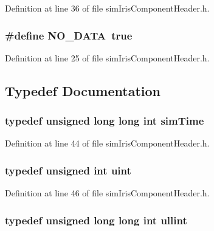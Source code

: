 Definition at line 36 of file simIrisComponentHeader.h.
\subsubsection[{NO\_\-DATA}]{\setlength{\rightskip}{0pt plus 5cm}\#define NO\_\-DATA~true}\label{simIrisComponentHeader_8h_68de9030c39965958f08402f7d452ad9}




Definition at line 25 of file simIrisComponentHeader.h.

\subsection{Typedef Documentation}
\subsubsection[{simTime}]{\setlength{\rightskip}{0pt plus 5cm}typedef unsigned long long int {\bf simTime}}\label{simIrisComponentHeader_8h_d88faca783e7aa496cda721d9029a2e3}




Definition at line 44 of file simIrisComponentHeader.h.
\subsubsection[{uint}]{\setlength{\rightskip}{0pt plus 5cm}typedef unsigned int {\bf uint}}\label{simIrisComponentHeader_8h_91ad9478d81a7aaf2593e8d9c3d06a14}




Definition at line 46 of file simIrisComponentHeader.h.
\subsubsection[{ullint}]{\setlength{\rightskip}{0pt plus 5cm}typedef unsigned long long int {\bf ullint}}\label{simIrisComponentHeader_8h_b03b0cc5e09b0e1f1ca05c2502cb93f4}




